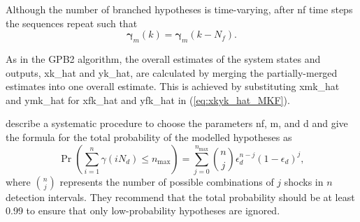 Although the number of branched hypotheses is time-varying, after \gls{nf} time steps the sequences repeat such that 
\begin{equation} \label{eq:rmkrmkmNf_SFex2}
	\mathbf{\gamma}_m(k) = \mathbf{\gamma}_m(k-N_f).
\end{equation}

As in the \gls{GPB2} algorithm, the overall estimates of the system states and outputs, \gls{xk_hat} and \gls{yk_hat}, are calculated by merging the partially-merged estimates into one overall estimate. This is achieved by substituting \gls{xmk_hat} and \gls{ymk_hat} for \gls{xfk_hat} and \gls{yfk_hat} in (\ref{eq:xkyk_hat_MKF}).

\cite{robertson_detection_1995} describe a systematic procedure to choose the parameters \gls{nf}, \gls{m}, and \gls{d} and give the formula for the total probability of the modelled hypotheses as
\begin{equation} \label{eq:p_gamma}
	\operatorname{Pr}\left(\sum_{i=1}^{n} \gamma(i N_d) \leq n_\text{max}\right) = \sum_{j=0}^{n_\text{max}} \binom{n}{j} \epsilon_d^{n-j}(1-\epsilon_d)^{j},
\end{equation}
where $\binom{n}{j}$ represents the number of possible combinations of $j$ shocks in $n$ detection intervals. They recommend that the total probability should be at least 0.99 to ensure that only low-probability hypotheses are ignored.

